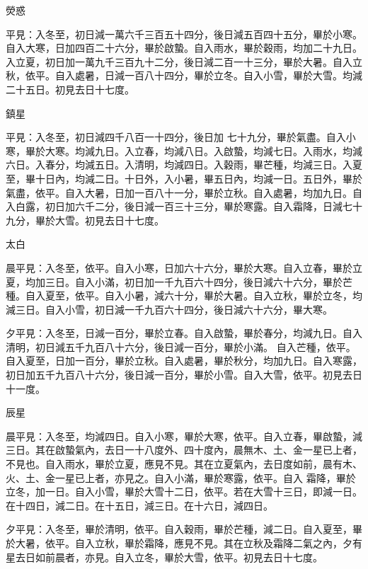 \begin{pinyinscope}
 熒惑



 平見：入冬至，初日減一萬六千三百五十四分，後日減五百四十五分，畢於小寒。自入大寒，日加四百二十六分，畢於啟蟄。自入雨水，畢於穀雨，均加二十九日。入立夏，初日加一萬九千三百九十二分，後日減二百一十三分，畢於大暑。自入立秋，依平。自入處暑，日減一百八十四分，畢於立冬。自入小雪，畢於大雪。均減二十五日。初見去日十七度。



 鎮星



 平見：入冬至，初日減四千八百一十四分，後日加
 七十九分，畢於氣盡。自入小寒，畢於大寒。均減九日。入立春，均減八日。入啟蟄，均減七日。入雨水，均減六日。入春分，均減五日。入清明，均減四日。入穀雨，畢芒種，均減三日。入夏至，畢十日內，均減二日。十日外，入小暑，畢五日內，均減一日。五日外，畢於氣盡，依平。自入大暑，日加一百八十一分，畢於立秋。自入處暑，均加九日。自入白露，初日加六千二分，後日減一百三十三分，畢於寒露。自入霜降，日減七十九分，畢於大雪。初見去日十七度。



 太白



 晨平見：入冬至，依平。自入小寒，日加六十六分，畢於大寒。自入立春，畢於立夏，均加三日。自入小滿，初日加一千九百六十四分，後日減六十六分，畢於芒種。自入夏至，依平。自入小暑，減六十分，畢於大暑。自入立秋，畢於立冬，均減三日。自入小雪，初日減一千九百六十四分，後日減六十六分，畢大寒。



 夕平見：入冬至，日減一百分，畢於立春。自入啟蟄，畢於春分，均減九日。自入清明，初日減五千九百八十六分，後日減一百分，畢於小滿。
 自入芒種，依平。自入夏至，日加一百分，畢於立秋。自入處暑，畢於秋分，均加九日。自入寒露，初日加五千九百八十六分，後日減一百分，畢於小雪。自入大雪，依平。初見去日十一度。



 辰星



 晨平見：入冬至，均減四日。自入小寒，畢於大寒，依平。自入立春，畢啟蟄，減三日。其在啟蟄氣內，去日一十八度外、四十度內，晨無木、土、金一星已上者，不見也。自入雨水，畢於立夏，應見不見。其在立夏氣內，去日度如前，晨有木、火、土、金一星已上者，亦見之。自入小滿，畢於寒露，依平。自入
 霜降，畢於立冬，加一日。自入小雪，畢於大雪十二日，依平。若在大雪十三日，即減一日。在十四日，減二日。在十五日，減三日。在十六日，減四日。



 夕平見：入冬至，畢於清明，依平。自入穀雨，畢於芒種，減二日。自入夏至，畢於大暑，依平。自入立秋，畢於霜降，應見不見。其在立秋及霜降二氣之內，夕有星去日如前晨者，亦見。自入立冬，畢於大雪，依平。初見去日十七度。




\end{pinyinscope}
